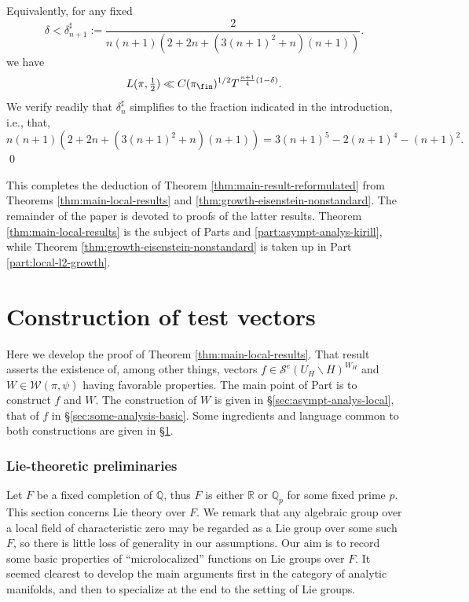 Equivalently, for any fixed
\begin{equation*}
  \delta < \delta_{n+1} ^\sharp  := \frac{2}{n(n+1) (2 + 2 n + (3 (n+1)^2 + n)(n+1))}.
\end{equation*}
we have
\begin{equation*}
  L(\pi,\tfrac{1}{2}) \ll C(\pi_{\fin})^{1/2} T^{\frac{n+1}{4}(1 - \delta)}.
\end{equation*}
We verify readily that $\delta_n^\sharp$ simplifies to the fraction indicated in the introduction, i.e., that,
\begin{equation*}
  n(n+1) (2 + 2 n + (3 (n+1)^2 + n)(n+1))
  = 3 ( n+1)^5 - 2 (n+1)^4 - (n+1)^2.
\end{equation*}
\qed

This completes the deduction of Theorem \ref{thm:main-result-reformulated} from Theorems \ref{thm:main-local-results} and \ref{thm:growth-eisenstein-nonstandard}.  The remainder of the paper is devoted to proofs of the latter results.  Theorem \ref{thm:main-local-results} is the subject of Parts \ref{part:constr-test-vect} and \ref{part:asympt-analys-kirill}, while Theorem \ref{thm:growth-eisenstein-nonstandard} is taken up in Part \ref{part:local-l2-growth}.








\part{Construction of test vectors}\label{part:constr-test-vect}

Here we develop the proof of Theorem \ref{thm:main-local-results}.  That result asserts the existence of, among other things, vectors $f \in \mathcal{S}^e(U_H \backslash H)^{W_H}$ and $W \in \mathcal{W}(\pi,\psi)$ having favorable properties.  The main point of Part \ref{part:constr-test-vect} is to construct $f$ and $W$.  The construction of $W$ is given in \S\ref{sec:asympt-analys-local}, that of $f$ in \S\ref{sec:some-analysis-basic}.  Some ingredients and language common to both constructions are given in \S\ref{sec:modul-bump-funct}.

\section{Lie-theoretic preliminaries}\label{sec:modul-bump-funct}

Let $F$ be a fixed completion of $\mathbb{Q}$, thus $F$ is either $\mathbb{R}$ or $\mathbb{Q}_p$ for some fixed prime $p$.  This section concerns Lie theory over $F$.  We remark that any algebraic group over a local field of characteristic zero may be regarded as a Lie group over some such $F$, so there is little loss of generality in our assumptions.  Our aim is to record some basic properties of ``microlocalized'' functions on Lie groups over $F$.   It seemed clearest to develop the main arguments first in the category of analytic manifolds, and then to specialize at the end to the setting of Lie groups.

